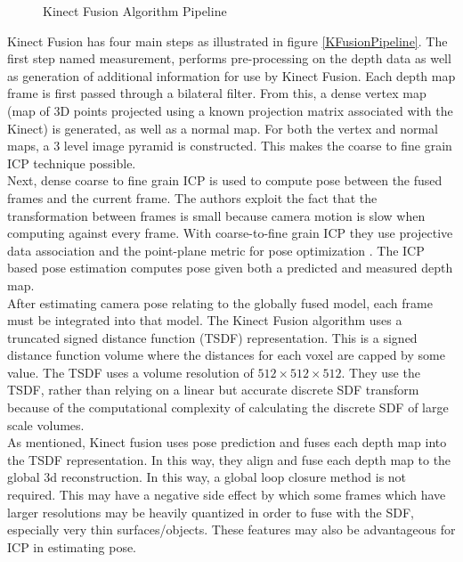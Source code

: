 \begin{figure}[!h]
\centering
\caption{Kinect Fusion Algorithm Pipeline \cite{Newcombe11Kinectfusion}}
\label{KFusionPipeliciteHne}
\end{figure}

Kinect Fusion has four main steps as illustrated in figure \ref{KFusionPipeline}. The first step named measurement, performs pre-processing on the depth data as well as generation of additional information for use by Kinect Fusion. Each depth map frame is first passed through a bilateral filter. From this, a dense vertex map (map of 3D points projected using a known projection matrix associated with the Kinect) is generated, as well as a normal map. For both the vertex and normal maps, a 3 level image pyramid is constructed. This makes the coarse to fine grain ICP technique possible. \\

Next, dense coarse to fine grain ICP is used to compute pose between the fused frames and the current frame. The authors exploit the fact that the transformation between frames is small because camera motion is slow when computing against every frame. With coarse-to-fine grain ICP they use projective data association \cite{Blais95Registering} and the point-plane metric for pose optimization \cite{Rusinkiewicz02Real}. The ICP based pose estimation computes pose given both a predicted and measured depth map. \\

After estimating camera pose relating to the globally fused model, each frame must be integrated into that model. The Kinect Fusion algorithm uses a truncated signed distance function (TSDF) representation. This is a signed distance function volume where the distances for each voxel are capped by some value. The TSDF uses a volume resolution of $512\times 512\times 512$. They use the TSDF, rather than relying on a linear but accurate discrete SDF transform \cite{Rasch09Remarks} because of the computational complexity of calculating the discrete SDF of large scale volumes. \\

As mentioned, Kinect fusion uses pose prediction and fuses each depth map into the TSDF representation. In this way, they align and fuse each depth map to the global 3d reconstruction. In this way, a global loop closure method is not required. This may have a negative side effect by which some frames which have larger resolutions may be heavily quantized in order to fuse with the SDF, especially very thin surfaces/objects. These features may also be advantageous for ICP in estimating pose. 


